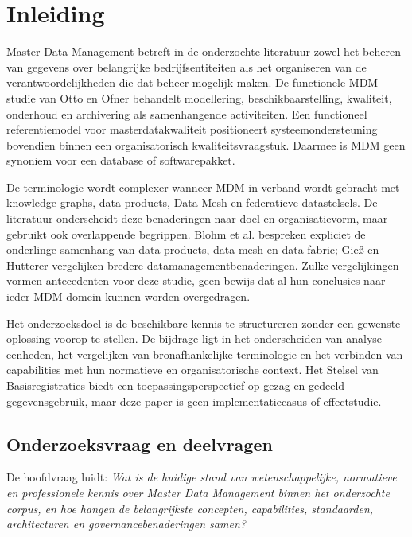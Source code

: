 \section{Inleiding}
Master Data Management betreft in de onderzochte literatuur zowel het beheren van gegevens over belangrijke bedrijfsentiteiten als het organiseren van de verantwoordelijkheden die dat beheer mogelijk maken. De functionele MDM-studie van Otto en Ofner behandelt modellering, beschikbaarstelling, kwaliteit, onderhoud en archivering als samenhangende activiteiten. Een functioneel referentiemodel voor masterdatakwaliteit positioneert systeemondersteuning bovendien binnen een organisatorisch kwaliteitsvraagstuk. Daarmee is MDM geen synoniem voor een database of softwarepakket. \parencite{L20,L05}

De terminologie wordt complexer wanneer MDM in verband wordt gebracht met knowledge graphs, data products, Data Mesh en federatieve datastelsels. De literatuur onderscheidt deze benaderingen naar doel en organisatievorm, maar gebruikt ook overlappende begrippen. Blohm et al. bespreken expliciet de onderlinge samenhang van data products, data mesh en data fabric; Gieß en Hutterer vergelijken bredere datamanagementbenaderingen. Zulke vergelijkingen vormen antecedenten voor deze studie, geen bewijs dat al hun conclusies naar ieder MDM-domein kunnen worden overgedragen. \parencite{L12,L24}

Het onderzoeksdoel is de beschikbare kennis te structureren zonder een gewenste oplossing voorop te stellen. De bijdrage ligt in het onderscheiden van analyse-eenheden, het vergelijken van bronafhankelijke terminologie en het verbinden van capabilities met hun normatieve en organisatorische context. Het Stelsel van Basisregistraties biedt een toepassingsperspectief op gezag en gedeeld gegevensgebruik, maar deze paper is geen implementatiecasus of effectstudie.

\subsection{Onderzoeksvraag en deelvragen}
De hoofdvraag luidt: \emph{Wat is de huidige stand van wetenschappelijke, normatieve en professionele kennis over Master Data Management binnen het onderzochte corpus, en hoe hangen de belangrijkste concepten, capabilities, standaarden, architecturen en governancebenaderingen samen?}

